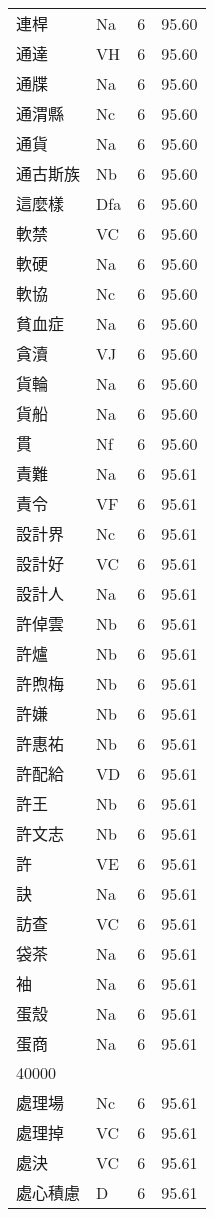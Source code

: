\documentclass[twocolumn]{book}
\begin{document}
\begin{supertabular}{llrr}
連桿 & Na & 6 &  95.60\\
通達 & VH & 6 &  95.60\\
通牒 & Na & 6 &  95.60\\
通渭縣 & Nc & 6 &  95.60\\
通貨 & Na & 6 &  95.60\\
通古斯族 & Nb & 6 &  95.60\\
這麼樣 & Dfa & 6 &  95.60\\
軟禁 & VC & 6 &  95.60\\
軟硬 & Na & 6 &  95.60\\
軟協 & Nc & 6 &  95.60\\
貧血症 & Na & 6 &  95.60\\
貪瀆 & VJ & 6 &  95.60\\
貨輪 & Na & 6 &  95.60\\
貨船 & Na & 6 &  95.60\\
貫 & Nf & 6 &  95.60\\
責難 & Na & 6 &  95.61\\
責令 & VF & 6 &  95.61\\
設計界 & Nc & 6 &  95.61\\
設計好 & VC & 6 &  95.61\\
設計人 & Na & 6 &  95.61\\
許倬雲 & Nb & 6 &  95.61\\
許爐 & Nb & 6 &  95.61\\
許煦梅 & Nb & 6 &  95.61\\
許嫌 & Nb & 6 &  95.61\\
許惠祐 & Nb & 6 &  95.61\\
許配給 & VD & 6 &  95.61\\
許王 & Nb & 6 &  95.61\\
許文志 & Nb & 6 &  95.61\\
許 & VE & 6 &  95.61\\
訣 & Na & 6 &  95.61\\
訪查 & VC & 6 &  95.61\\
袋茶 & Na & 6 &  95.61\\
袖 & Na & 6 &  95.61\\
蛋殼 & Na & 6 &  95.61\\
蛋商 & Na & 6 &  95.61\\
40000\\
處理場 & Nc & 6 &  95.61\\
處理掉 & VC & 6 &  95.61\\
處決 & VC & 6 &  95.61\\
處心積慮 & D & 6 &  95.61\\

\end{supertabular}
\end{document}
